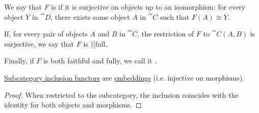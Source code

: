 \begin{definition}
\begin{thmenum}
     We say that \( F \) is  if it is surjective on objects up to an isomorphism: for every object \( Y \) in \( \cat{D} \), there exists some object \( A \) in \( \cat{C} \) such that \( F(A) \cong Y \).

     If, for every pair of objects \( A \) and \( B \) in \( \cat{C} \), the restriction of \( F \) to \( \cat{C}(A, B) \) is surjective, we say that \( F \) is \term[ru=полный (функтор) (\cite[131]{ЦаленкоШульгейфер1974ОсновыТеорииКатегорий})]{full}.

     Finally, if \( F \) is both faithful and fully, we call it .
  \end{thmenum}
\end{definition}

\begin{proposition}\label{thm:subcategory_inclusion_is_embedding}
  \hyperref[def:subcategory/inclusion]{Subcategory inclusion functors} are \hyperref[def:functor_invertibility/injective]{embeddings} (i.e. injective on morphisms).
\end{proposition}
\begin{proof}
  When restricted to the subcategory, the inclusion coincides with the identity for both objects and morphisms.
\end{proof}

